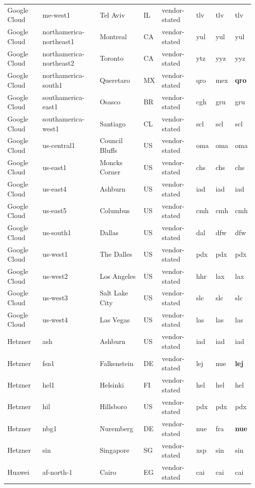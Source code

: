\begin{longtable}{llllllll}
Google Cloud & me-west1 & Tel Aviv & IL & vendor-stated & tlv & tlv & tlv \\
Google Cloud & northamerica-northeast1 & Montreal & CA & vendor-stated & yul & yul & yul \\
Google Cloud & northamerica-northeast2 & Toronto & CA & vendor-stated & ytz & yyz & yyz \\
Google Cloud & northamerica-south1 & Queretaro & MX & vendor-stated & qro & mex & \textbf{qro} \\
Google Cloud & southamerica-east1 & Osasco & BR & vendor-stated & cgh & gru & gru \\
Google Cloud & southamerica-west1 & Santiago & CL & vendor-stated & scl & scl & scl \\
Google Cloud & us-central1 & Council Bluffs & US & vendor-stated & oma & oma & oma \\
Google Cloud & us-east1 & Moncks Corner & US & vendor-stated & chs & chs & chs \\
Google Cloud & us-east4 & Ashburn & US & vendor-stated & iad & iad & iad \\
Google Cloud & us-east5 & Columbus & US & vendor-stated & cmh & cmh & cmh \\
Google Cloud & us-south1 & Dallas & US & vendor-stated & dal & dfw & dfw \\
Google Cloud & us-west1 & The Dalles & US & vendor-stated & pdx & pdx & pdx \\
Google Cloud & us-west2 & Los Angeles & US & vendor-stated & hhr & lax & lax \\
Google Cloud & us-west3 & Salt Lake City & US & vendor-stated & slc & slc & slc \\
Google Cloud & us-west4 & Las Vegas & US & vendor-stated & las & las & las \\
Hetzner & ash & Ashburn & US & vendor-stated & iad & iad & iad \\
Hetzner & fsn1 & Falkenstein & DE & vendor-stated & lej & nue & \textbf{lej} \\
Hetzner & hel1 & Helsinki & FI & vendor-stated & hel & hel & hel \\
Hetzner & hil & Hillsboro & US & vendor-stated & pdx & pdx & pdx \\
Hetzner & nbg1 & Nuremberg & DE & vendor-stated & nue & fra & \textbf{nue} \\
Hetzner & sin & Singapore & SG & vendor-stated & xsp & sin & sin \\
Huawei & af-north-1 & Cairo & EG & vendor-stated & cai & cai & cai \\

\end{longtable}
